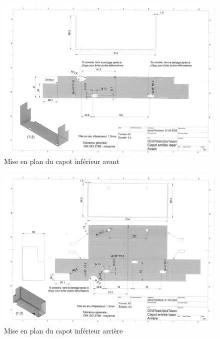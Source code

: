 
\newpage
\begin{figure}[H]
    \centering
    \includegraphics[angle=90,width=\textwidth]{assets/figures/Annexes/Mises_en_plan/mise_en_plan_avant.png}
    \caption{Mise en plan du capot inférieur avant}
    \label{mise_en_plan_capot_avant}
\end{figure}

\begin{figure}[H]
    \centering
    \includegraphics[angle=90,width=\textwidth]{assets/figures/Annexes/Mises_en_plan/mise_en_plan_arriere.png}
    \caption{Mise en plan du capot inférieur arrière}
    \label{mise_en_plan_capot_arriere}
\end{figure}

